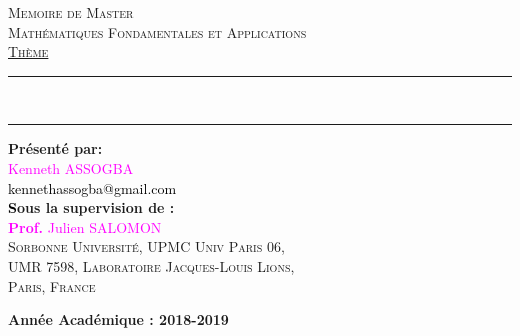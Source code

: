 \begin{titlepage}
\begin{center}

\begin{center}
\textsc{Memoire de Master}\\
\vspace{0.5cm}
\textsc{Math\'ematiques Fondamentales et Applications}\\
\vspace{1.2cm}
\textsc{\underline{Thème}}\\
\vspace{0.8cm}
\end{center}

\rule{\linewidth}{1mm}\\
\begin{center}
\textsc{\textbf{ \color{blue}{Schémas monotones discrets pour l'équation de Schrödinger}}}
\end{center}
\rule{\linewidth}{1mm}
\vspace{1cm}
\begin{flushright}
\textbf{Présenté par:}\\
\vspace{0.2cm}
\textcolor{magenta}{Kenneth ASSOGBA}\\
\textcolor{black}{kennethassogba@gmail.com}\\
\vspace{1cm}
\textbf{\textcolor{black}Sous la supervision de :}\\
\vspace{0.2cm}
\textcolor{magenta}{\textbf{Prof.} Julien SALOMON}\\
\textsc{Sorbonne Université, UPMC Univ Paris 06,\\
	UMR 7598, Laboratoire Jacques-Louis Lions,\\
	Paris, France}\\
\vspace{0.2cm}
\end{flushright}
\vspace{2cm}
\vspace{4cm}
\begin{center}
\noindent \textbf{Année Acad\'emique : 2018-2019}
\end{center}
\end{center}
\end{titlepage}